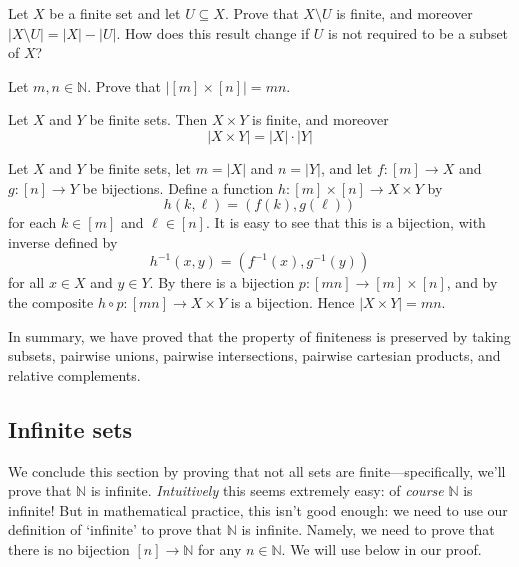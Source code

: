 \begin{exercise}
Let $X$ be a finite set and let $U \subseteq X$. Prove that $X \setminus U$ is finite, and moreover $|X \setminus U| = |X| - |U|$. How does this result change if $U$ is not required to be a subset of $X$?
\end{exercise}

\begin{exercise}
\label{exSizeOfCartesianProduct}
Let $m,n \in \mathbb{N}$. Prove that $|[m] \times [n]| = mn$.
\end{exercise}

\begin{proposition}
\label{propProductOfFiniteSetsIsFinite}
Let $X$ and $Y$ be finite sets. Then $X \times Y$ is finite, and moreover
\[ |X \times Y| = |X| \cdot |Y| \]
\end{proposition}
\begin{cproof}
Let $X$ and $Y$ be finite sets, let $m=|X|$ and $n=|Y|$, and let $f : [m] \to X$ and $g : [n] \to Y$ be bijections. Define a function $h : [m] \times [n] \to X \times Y$ by
\[ h(k,\ell) = (f(k),g(\ell)) \]
for each $k \in [m]$ and $\ell \in [n]$. It is easy to see that this is a bijection, with inverse defined by
\[ h^{-1}(x,y) = (f^{-1}(x), g^{-1}(y)) \]
for all $x \in X$ and $y \in Y$. By  there is a bijection $p : [mn] \to [m] \times [n]$, and by  the composite $h \circ p : [mn] \to X \times Y$ is a bijection. Hence $|X \times Y| = mn$.
\end{cproof}

In summary, we have proved that the property of finiteness is preserved by taking subsets, pairwise unions, pairwise intersections, pairwise cartesian products, and relative complements.

\subsection*{Infinite sets}

We conclude this section by proving that not all sets are finite---specifically, we'll prove that $\mathbb{N}$ is infinite. \textit{Intuitively} this seems extremely easy: of \textit{course} $\mathbb{N}$ is infinite! But in mathematical practice, this isn't good enough: we need to use our definition of `infinite' to prove that $\mathbb{N}$ is infinite. Namely, we need to prove that there is no bijection $[n] \to \mathbb{N}$ for any $n \in \mathbb{N}$. We will use  below in our proof.

